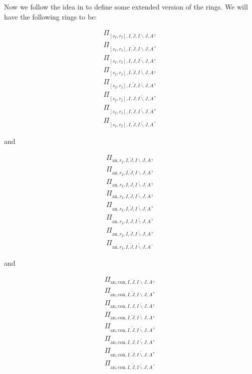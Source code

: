 \documentclass[12pt]{amsart}
\theoremstyle{definition}
\numberwithin{equation}{section}
\begin{document}
\indent Now we follow the idea in \cite[Definition 5.2.1]{Ked2} to define some extended version of the rings. We will have the following rings to be:


\begin{align}
\Pi_{[s_I,r_I],I,\breve{J},I\backslash J,A},\\	
\Pi_{[s_I,r_I],I,\widetilde{J},I\backslash J,A},\\
\Pi_{[s_I,r_I],I,J,\breve{I\backslash J},A},\\	
\Pi_{[s_I,r_I],I,\breve{J},\breve{I\backslash J},A},\\	
\Pi_{[s_I,r_I],I,\widetilde{J},\breve{I\backslash J},A},\\
\Pi_{[s_I,r_I],I,J,\widetilde{I\backslash J},A},\\	
\Pi_{[s_I,r_I],I,\breve{J},\widetilde{I\backslash J},A},\\	
\Pi_{[s_I,r_I],I,\widetilde{J},\widetilde{I\backslash J},A}.	
\end{align}


and 

\begin{align}
\Pi_{\mathrm{an},r_I,I,\breve{J},I\backslash J,A},\\	
\Pi_{\mathrm{an},r_I,I,\widetilde{J},I\backslash J,A},\\
\Pi_{\mathrm{an},r_I,I,J,\breve{I\backslash J},A},\\	
\Pi_{\mathrm{an},r_I,I,\breve{J},\breve{I\backslash J},A},\\	
\Pi_{\mathrm{an},r_I,I,\widetilde{J},\breve{I\backslash J},A},\\
\Pi_{\mathrm{an},r_I,I,J,\widetilde{I\backslash J},A},\\	
\Pi_{\mathrm{an},r_I,I,\breve{J},\widetilde{I\backslash J},A},\\	
\Pi_{\mathrm{an},r_I,I,\widetilde{J},\widetilde{I\backslash J},A}.	
\end{align}

and 

\begin{align}
\Pi_{\mathrm{an},\mathrm{con},I,\breve{J},I\backslash J,A},\\	
\Pi_{\mathrm{an},\mathrm{con},I,\widetilde{J},I\backslash J,A},\\
\Pi_{\mathrm{an},\mathrm{con},I,J,\breve{I\backslash J},A},\\	
\Pi_{\mathrm{an},\mathrm{con},I,\breve{J},\breve{I\backslash J},A},\\
\Pi_{\mathrm{an},\mathrm{con},I,\widetilde{J},\breve{I\backslash J},A},\\
\Pi_{\mathrm{an},\mathrm{con},I,J,\widetilde{I\backslash J},A},\\	
\Pi_{\mathrm{an},\mathrm{con},I,\breve{J},\widetilde{I\backslash J},A},\\	
\Pi_{\mathrm{an},\mathrm{con},I,\widetilde{J},\widetilde{I\backslash J},A}.	
\end{align}
\end{document}
